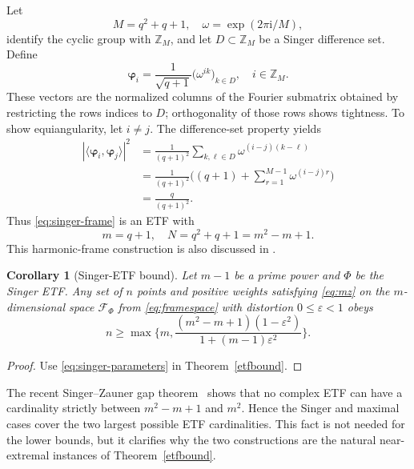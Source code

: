 \documentclass[a4paper]{amsart}
\numberwithin{equation}{section}
\newtheorem{corollary}[theorem]{Corollary}
\begin{document}
Let
\begin{equation*}
    M=q^2+q+1,
    \quad
    \omega=\exp(2\pi\mathrm i/M),
\end{equation*}
identify the cyclic group with $\mathds Z_M$, and let $D\subset\mathds Z_M$ be a Singer difference set. Define
\begin{equation}\label{eq:singer-frame}
    \bm\varphi_i
    =\frac1{\sqrt{q+1}}\big(\omega^{ik}\big)_{k\in D},
    \quad i\in\mathds Z_M.
\end{equation}
These vectors are the normalized columns of the Fourier submatrix obtained by restricting the rows indices to $D$; orthogonality of those rows shows tightness.
To show equiangularity, let $i\neq j$.
The difference-set property yields
\begin{align*}
    |\langle\bm\varphi_i,\bm\varphi_j\rangle|^2
    &=\frac1{(q+1)^2}
      \sum_{k,\ell\in D}\omega^{(i-j)(k-\ell)}\\
    &=\frac1{(q+1)^2}
      \Big((q+1)+\sum_{r=1}^{M-1}\omega^{(i-j)r}\Big)\\
    &=\frac{q}{(q+1)^2}.
\end{align*}
Thus \eqref{eq:singer-frame} is an ETF with
\begin{equation}\label{eq:singer-parameters}
    m=q+1,
    \quad
    N=q^2+q+1=m^2-m+1.
\end{equation}
This harmonic-frame construction is also discussed in \cite[Section~2.1.2]{SH03}.

\begin{corollary}[Singer-ETF bound]\label{cor:singer-etf}
    Let $m-1$ be a prime power and $\Phi$ be the Singer ETF.
    Any set of $n$ points and positive weights satisfying \eqref{eq:mz} on the $m$-dimensional space $\mathcal F_{\Phi}$ from \eqref{eq:framespace} with distortion $0\le \varepsilon<1$ obeys
    \begin{equation*}
        n
        \ge \max\Big\{
            m,
            \frac{(m^2-m+1)(1-\varepsilon^2)}{1+(m-1)\varepsilon^2}
        \Big\}.
    \end{equation*}
\end{corollary}

\begin{proof}
    Use \eqref{eq:singer-parameters} in Theorem~\ref{etfbound}.
\end{proof}

The recent Singer--Zauner gap theorem~\cite{FJM26} shows that no complex ETF can have a cardinality strictly between $m^2-m+1$ and $m^2$.
Hence the Singer and maximal cases cover the two largest possible ETF cardinalities.
This fact is not needed for the lower bounds, but it clarifies why the two constructions are the natural near-extremal instances of Theorem~\ref{etfbound}.
\end{document}
